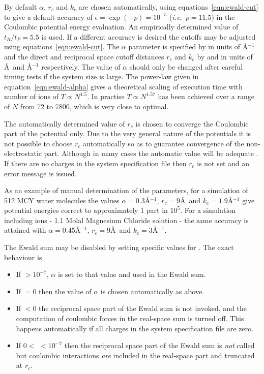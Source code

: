 \documentclass[a4paper,twoside]{report}
\newcommand{\ie}{\emph{i.e.}}
\begin{document}
By default $\alpha$, $r_c$ and $k_c$ are chosen automatically, using
equations~\ref{eqn:ewald-cut} to give a default accuracy of $\epsilon
= \exp(-p) = 10^{-5}$ (\ie\ $p = 11.5$) in the Coulombic potential energy
evaluation.  An empirically determined value of $t_R/t_F = 5.5$ is
used.  If a different accuracy is desired the cutoffs may be adjusted
using equations~\ref{eqn:ewald-cut}.  The $\alpha$ parameter is
specified by  in units of {\AA}$^{-1}$ and the direct and
reciprocal space cutoff distances $r_{c}$ and $k_{c}$ by
 and  in units of {\AA}\ and {\AA}$^{-1}$
respectively.  The value of $\alpha$ should only be changed after
careful timing tests if the system size is large.  The power-law given
in equation~\ref{eqn:ewald-alpha} gives a theoretical scaling of
execution time with number of ions of $T \propto N^{1.5}$. In practise $T
\propto N^{1.57}$ has been achieved over a range of $N$ from 72 to
7800, which is very close to optimal.

 The automatically determined value of $r_c$
is chosen to converge the Coulombic part of the potential only.  Due
to the very general nature of the potentials it is not possible to
choose $r_c$ automatically so as to guarantee convergence of the
non-electrostatic part. Although in many cases the automatic value
will be adequate . If there are no charges in the system
specification file then $r_c$ is not set and an error message is
issued.

As an example of manual determination of the parameters, for a
simulation of 512 MCY water molecules the values $\alpha =
0.3${\AA}$^{-1}$, $r_{c} = 9${\AA}\ and $k_{c} = 1.9${\AA}$^{-1}$ give
potential energies correct to approximately 1 part in $10^{5}$.  For a
simulation including ions - 1.1 Molal Magnesium Chloride solution -
the same accuracy is attained with $\alpha = 0.45${\AA}$^{-1}$, $r_{c} =
9${\AA}\ and $k_{c} = 3${\AA}$^{-1}$.

The Ewald sum may be disabled by setting specific values for
.  The exact behaviour is
\begin{itemize}
\item If  $ > 10^{-7}$, $\alpha$ is set to that
  value and used in the Ewald sum.
\item If  $ = 0$ then the value of $\alpha$ is
  chosen automatically as above.
\item If  $ < 0$ the reciprocal space part of the
  Ewald sum is not invoked, and the computation of coulombic forces in
  the real-space sum is turned off.  This happens automatically if all 
  charges in the system specification file are zero.
\item If $0 < $  $ < 10^{-7}$ then the reciprocal
  space part of the Ewald sum is \emph{not} called but coulombic
  interactions \emph{are} included in the real-space part and truncated
  at $r_c$.
\end{itemize}
\end{document}
